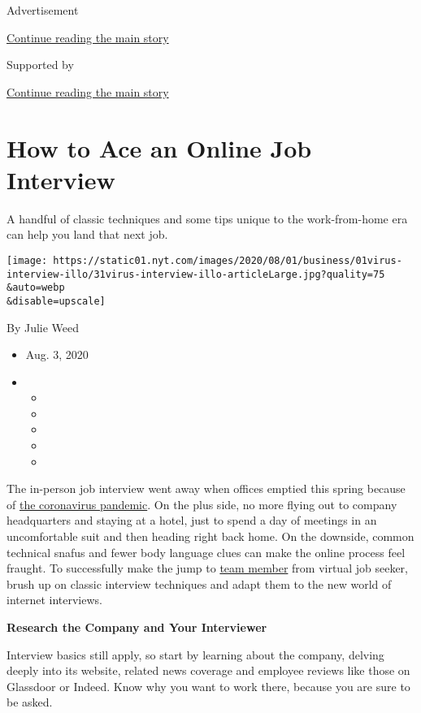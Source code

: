 Advertisement

\protect\hyperlink{after-top}{Continue reading the main story}

Supported by

\protect\hyperlink{after-sponsor}{Continue reading the main story}

\hypertarget{how-to-ace-an-online-job-interview}{%
\section{How to Ace an Online Job
Interview}\label{how-to-ace-an-online-job-interview}}

A handful of classic techniques and some tips unique to the
work-from-home era can help you land that next job.

\texttt{[image: https://static01.nyt.com/images/2020/08/01/business/01virus-interview-illo/31virus-interview-illo-articleLarge.jpg?quality=75\\\&auto=webp\\\&disable=upscale]}

By Julie Weed

\begin{itemize}
\item
  Aug. 3, 2020
\item
  \begin{itemize}
  \item
  \item
  \item
  \item
  \item
  \end{itemize}
\end{itemize}

The in-person job interview went away when offices emptied this spring
because of \href{https://www.nytimes.com/news-event/coronavirus}{the
coronavirus pandemic}. On the plus side, no more flying out to company
headquarters and staying at a hotel, just to spend a day of meetings in
an uncomfortable suit and then heading right back home. On the downside,
common technical snafus and fewer body language clues can make the
online process feel fraught. To successfully make the jump to
\href{https://www.nytimes.com/2020/06/21/business/work-home-coronavirus.html}{team
member} from virtual job seeker, brush up on classic interview
techniques and adapt them to the new world of internet interviews.

\textbf{Research the Company and Your Interviewer}

Interview basics still apply, so start by learning about the company,
delving deeply into its website, related news coverage and employee
reviews like those on Glassdoor or Indeed. Know why you want to work
there, because you are sure to be asked.

